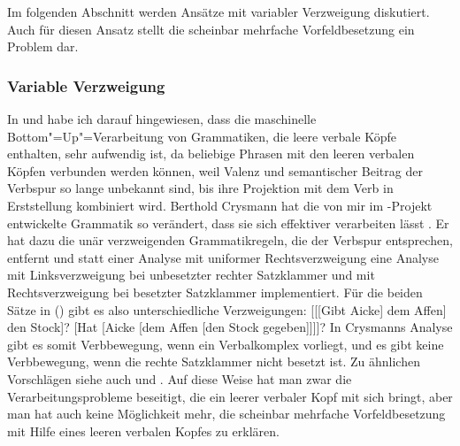 \begin{exe}
\begin{xlist}

Im folgenden Abschnitt werden Ansätze mit variabler Verzweigung diskutiert. Auch für diesen Ansatz stellt die
scheinbar mehrfache Vorfeldbesetzung ein Problem dar.



\subsubsection{Variable Verzweigung}
\label{sec-Crysmann}

In  und  habe ich darauf hingewiesen,
dass die maschinelle Bottom"=Up"=Verarbeitung von Grammatiken, die leere verbale Köpfe enthalten, sehr aufwendig
ist, da beliebige Phrasen mit den leeren verbalen Köpfen verbunden werden können, weil
Valenz und semantischer Beitrag der Verbspur so lange unbekannt sind, bis ihre Projektion
mit dem Verb in Erststellung kombiniert wird. 
%
Berthold Crysmann hat die von mir im \verbmobil-Projekt
entwickelte Grammatik \citep{MK2000a} so verändert, dass sie sich effektiver verarbeiten lässt \citep{Crysmann2003b}.
Er hat dazu die unär verzweigenden Grammatikregeln, die der Verbspur entsprechen, entfernt und statt einer
Analyse mit uniformer Rechtsverzweigung eine Analyse mit Linksverzweigung bei unbesetzter
rechter Satzklammer und mit Rechtsverzweigung bei besetzter Satzklammer implementiert.
Für die beiden Sätze in () gibt es also unterschiedliche Verzweigungen:
\largerpage
\eal
\ex {}[[[Gibt Aicke] dem Affen] den Stock]?
\ex {}[Hat [Aicke [dem Affen [den Stock gegeben]]]]?
\zl
In Crysmanns Analyse gibt es somit Verbbewegung, wenn ein Verbalkomplex vorliegt, und es
gibt keine Verbbewegung, wenn die rechte Satzklammer nicht besetzt ist.
Zu ähnlichen Vorschlägen siehe auch  und .
Auf diese Weise hat man zwar die Verarbeitungsprobleme beseitigt, die ein leerer verbaler Kopf mit sich
bringt, aber man hat auch keine Möglichkeit mehr, die scheinbar mehrfache
Vorfeldbesetzung mit Hilfe eines leeren verbalen Kopfes zu erklären.


\end{xlist}
\end{exe}
